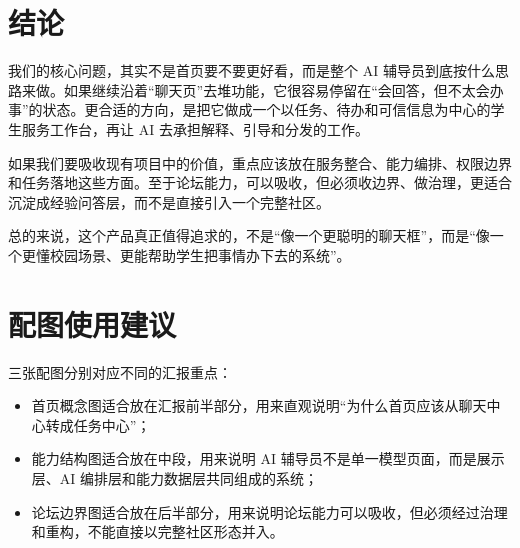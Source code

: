 \documentclass[12pt,a4paper]{ctexart}
\begin{document}
\section{结论}
我们的核心问题，其实不是首页要不要更好看，而是整个 AI 辅导员到底按什么思路来做。如果继续沿着“聊天页”去堆功能，它很容易停留在“会回答，但不太会办事”的状态。更合适的方向，是把它做成一个以任务、待办和可信信息为中心的学生服务工作台，再让 AI 去承担解释、引导和分发的工作。

如果我们要吸收现有项目中的价值，重点应该放在服务整合、能力编排、权限边界和任务落地这些方面。至于论坛能力，可以吸收，但必须收边界、做治理，更适合沉淀成经验问答层，而不是直接引入一个完整社区。

总的来说，这个产品真正值得追求的，不是“像一个更聪明的聊天框”，而是“像一个更懂校园场景、更能帮助学生把事情办下去的系统”。

\appendix
\section{配图使用建议}
三张配图分别对应不同的汇报重点：
\begin{itemize}
  \item 首页概念图适合放在汇报前半部分，用来直观说明“为什么首页应该从聊天中心转成任务中心”；
  \item 能力结构图适合放在中段，用来说明 AI 辅导员不是单一模型页面，而是展示层、AI 编排层和能力数据层共同组成的系统；
  \item 论坛边界图适合放在后半部分，用来说明论坛能力可以吸收，但必须经过治理和重构，不能直接以完整社区形态并入。
\end{itemize}
\end{document}
